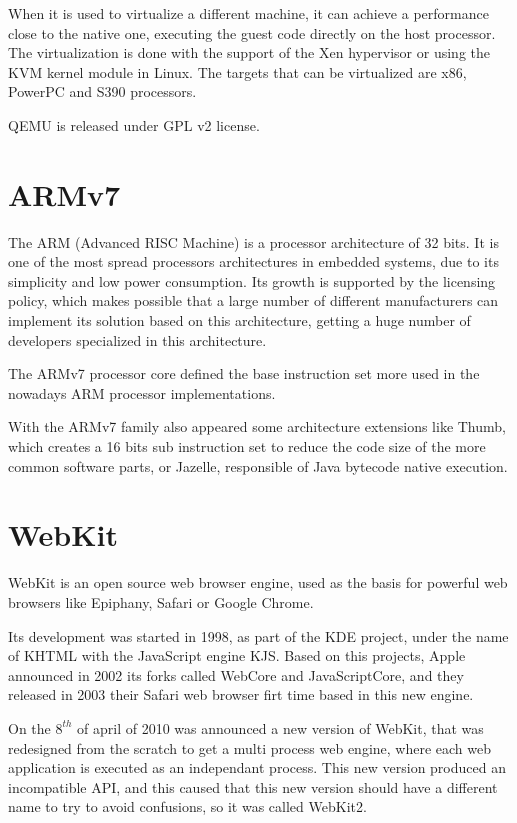 \documentclass[a4paper,11pt,openany]{report}
\begin{document}
When it is used to virtualize a different machine, it can achieve a performance close to the native one, executing the guest code directly on the host processor. The virtualization is done with the support of the Xen hypervisor or using the KVM kernel module in Linux. The targets that can be virtualized are x86, PowerPC and S390 processors.

QEMU is released under GPL v2 license.

\section{ARMv7}
The ARM (Advanced RISC Machine)\cite{arm} is a processor architecture of 32 bits. It is one of the most spread processors architectures in embedded systems, due to its simplicity and low power consumption. Its growth is supported by the licensing policy, which makes possible that a large number of different manufacturers can implement its solution based on this architecture, getting a huge number of developers specialized in this architecture.

The ARMv7 processor core defined the base instruction set more used in the nowadays ARM processor implementations.

With the ARMv7 family also appeared some architecture extensions like Thumb, which creates a 16 bits sub instruction set to reduce the code size of the more common software parts, or Jazelle, responsible of Java bytecode native execution.

\section{WebKit}
WebKit\cite{webkit} is an open source web browser engine, used as the basis for powerful web browsers like Epiphany, Safari or Google Chrome.

Its development was started in 1998, as part of the KDE project, under the name of KHTML with the JavaScript engine KJS. Based on this projects, Apple announced in 2002 its forks called WebCore and JavaScriptCore, and they released in 2003 their Safari web browser firt time based in this new engine.

On the $8^{th}$ of april of 2010 was announced a new version of WebKit, that was redesigned from the scratch to get a multi process web engine, where each web application is executed as an independant process. This new version produced an incompatible API, and this caused that this new version should have a different name to try to avoid confusions, so it was called WebKit2.
\end{document}
